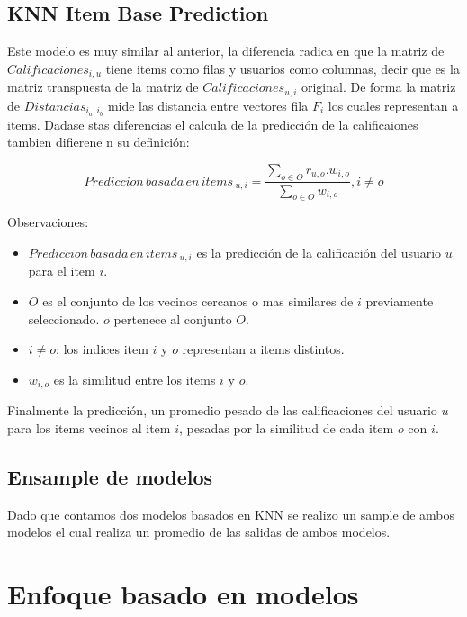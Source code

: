 \documentclass[11pt,a4paper,twoside]{thesis}
\begin{document}
\subsection{KNN Item Base Prediction}

Este modelo es muy similar al anterior, la diferencia radica en que la matriz de $Calificaciones_{i, u}$ tiene items como filas y usuarios como columnas, decir que es la matriz transpuesta de la matriz de $Calificaciones_{u, i}$ original. De forma la matriz de $Distancias_{i_a,i_b}$ mide las distancia entre vectores fila $F_i$ los cuales representan a items. Dadase stas diferencias el calcula de la predicción de la calificaiones tambien difierene n su definición:


\begin{equation*}
	Prediccion \mspace{3mu}basada \mspace{3mu}en \mspace{3mu}items\mspace{3mu}_{u, i} = \frac{\sum_{o \in O} r_{u, o}. w_{i, o} }{\sum_{o \in O} w_{i, o} }, i \neq o
\end{equation*}
\begin{description}
	\item[Observaciones:]
\end{description}
\begin{itemize}
	\item $Prediccion \mspace{3mu}basada \mspace{3mu}en \mspace{3mu}items\mspace{3mu}_{u, i}$ es la predicción de la calificación del usuario $u$ para el item $i$.
	\item $O$ es el conjunto de los vecinos cercanos o mas similares de $i$ previamente seleccionado. $o$ pertenece al conjunto $O$.
	\item $i \neq o$: los indices item $i$ y $o$ representan a items distintos. 
	\item $w_{i,o}$ es la similitud entre los items $i$ y $o$.
\end{itemize}

Finalmente la predicción, un promedio pesado de las calificaciones del usuario $u$ para los items vecinos al item $i$, pesadas por la similitud de cada item $o$ con $i$.

\subsection{Ensample de modelos}

Dado que contamos dos modelos basados en KNN se realizo un sample de ambos modelos el cual realiza un promedio de las salidas de ambos modelos.

\section{Enfoque basado en modelos}
\end{document}

